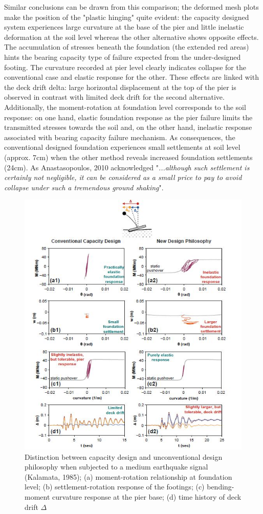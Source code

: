 \documentclass[11pt,a4paper]{report}
\begin{document}
Similar conclusions can be drawn from this comparison; the deformed mesh plots make the position of the "plastic hinging" quite evident: the capacity designed system experiences large curvature at the base of the pier and little inelastic deformation at the soil level whereas the other alternative shows opposite effects. The accumulation of stresses beneath the foundation (the extended red areas) hints the bearing capacity type of failure expected from the under-designed footing. The curvature recorded at pier level clearly indicates collapse for the conventional case and elastic response for the other. These effects are linked with the deck drift \gls{delta}: large horizontal displacement at the top of the pier is observed in contrast with limited deck drift for the second alternative. Additionally, the moment-rotation at foundation level corresponds to the soil response: on one hand, elastic foundation response as the pier failure limits the transmitted stresses towards the soil and, on the other hand, inelastic response associated with bearing capacity failure mechanism. As consequences, the conventional designed foundation experiences small settlements at soil level (approx. 7cm) when the other method reveals increased foundation settlements (24cm). As Anastasopoulos, 2010 \cite{anastasopoulos2010soil} acknowledged "\textit{...although such settlement is certainly not negligible, it can be considered as a small price to pay to avoid collapse under such a tremendous ground shaking}".

\begin{figure}[!h]
	\centering
	\includegraphics[width=0.9\linewidth]{"conven2"}
	\caption{Distinction between capacity design and unconventional design philosophy when subjected to a medium earthquake signal (Kalamata, 1985); (a) moment-rotation relationship at foundation level; (b) settlement-rotation response of the footings; (c) bending-moment curvature response at the pier base; (d) time history of deck drift $\Delta$}
	\label{conventional2}
\end{figure}
\end{document}
